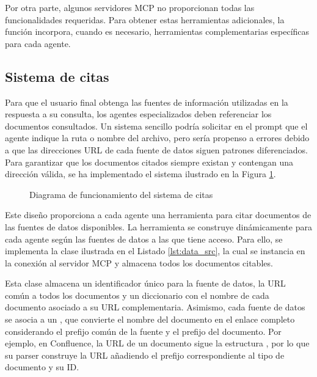 Por otra parte, algunos servidores MCP no proporcionan todas las funcionalidades requeridas. Para obtener estas herramientas adicionales, la función  incorpora, cuando es necesario, herramientas complementarias específicas para cada agente.

\subsection{Sistema de citas}
Para que el usuario final obtenga las fuentes de información utilizadas en la respuesta a su consulta, los agentes especializados deben referenciar los documentos consultados. Un sistema sencillo podría solicitar en el prompt que el agente indique la ruta o nombre del archivo, pero sería propenso a errores debido a que las direcciones URL de cada fuente de datos siguen patrones diferenciados. Para garantizar que los documentos citados siempre existan y contengan una dirección válida, se ha implementado el sistema ilustrado en la Figura \ref{fig:citations}.

\begin{figure}[h]
  \centering
  \caption{Diagrama de funcionamiento del sistema de citas}
  \label{fig:citations}
\end{figure}
Este diseño proporciona a cada agente una herramienta para citar documentos de las fuentes de datos disponibles. La herramienta se construye dinámicamente para cada agente según las fuentes de datos a las que tiene acceso. Para ello, se implementa la clase  ilustrada en el Listado \ref{lst:data_src}, la cual se instancia en la conexión al servidor MCP y almacena todos los documentos citables.

Esta clase almacena un identificador único para la fuente de datos, la URL común a todos los documentos y un diccionario con el nombre de cada documento asociado a su URL complementaria. Asimismo, cada fuente de datos se asocia a un , que convierte el nombre del documento en el enlace completo considerando el prefijo común de la fuente y el prefijo del documento. Por ejemplo, en Confluence, la URL de un documento sigue la estructura , por lo que su parser construye la URL añadiendo el prefijo correspondiente al tipo de documento y su ID.

